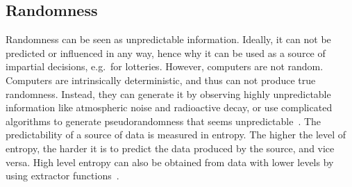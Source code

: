 \subsection{Randomness}
Randomness can be seen as unpredictable information. Ideally, it can not be predicted or influenced in any way, hence why it can be used as a source of impartial decisions, e.g.\ for lotteries.
However, computers are not random. Computers are intrinsically deterministic, and thus can not produce true randomness. Instead, they can generate it by observing highly unpredictable information like atmospheric noise and radioactive decay, or use complicated algorithms to generate pseudorandomness that seems unpredictable~\cite{randomsources}.
The predictability of a source of data is measured in entropy. The higher the level of entropy, the harder it is to predict the data produced by the source, and vice versa. High level entropy can also be obtained from data with lower levels by using extractor functions~\cite{pseudorandomness}.
